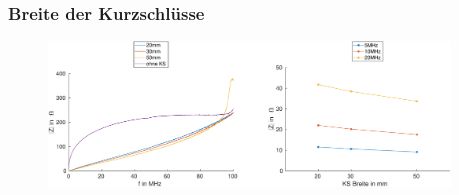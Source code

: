 \documentclass[accentcolor=tud9b, colorbacktitle, inverttitle]{tudbeamer}
\begin{document}
\begin{frame}
\begin{figure}[htb]
	\hspace{0.0312\textwidth}
\end{figure}
\vspace{-0.605\textwidth}
\begin{figure}[t]
	\flushright
\end{figure}

\end{frame}


\begin{frame}\frametitle{Breite der Kurzschlüsse}
\vspace{-1em}
\begin{figure}[h]
	\centering
	\includegraphics[width=0.95\textwidth]{Z_ges_width_frequency_SimMeas}
\end{figure}
\end{frame}


\end{document}
